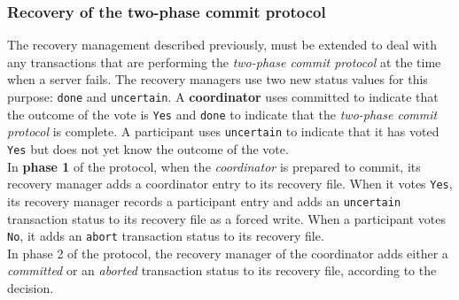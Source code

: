 \subsubsection{Recovery of the two-phase commit protocol}
The recovery management described previously, must be extended to deal with any transactions that are performing the \textit{two-phase commit protocol} at the time when a server fails. The recovery managers use two new status values for this purpose: \verb|done| and \verb|uncertain|. A \textbf{coordinator} uses committed to indicate that the outcome of the vote is \verb|Yes| and \verb|done| to indicate that the \textit{two-phase commit protocol} is complete. A participant uses \verb|uncertain| to indicate that it has voted
\verb|Yes| but does not yet know the outcome of the vote.\\
In \textbf{phase 1} of the protocol, when the \textit{coordinator} is prepared to commit, its recovery manager adds a coordinator entry to its recovery file. When it votes \verb|Yes|, its recovery manager records a participant entry and adds an \verb|uncertain| transaction status to its recovery file as a forced write. When a participant votes \verb|No|, it adds an \verb|abort| transaction status to its recovery file.\\
In phase 2 of the protocol, the recovery manager of the coordinator adds either a \textit{committed} or an \textit{aborted} transaction status to its recovery file, according to the decision.
\renewcommand{\arraystretch}{1.3}

